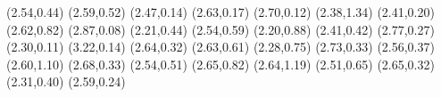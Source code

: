 \psdot[](2.54,0.44)
\psdot[](2.59,0.52)
\psdot[](2.47,0.14)
\psdot[](2.63,0.17)
\psdot[](2.70,0.12)
\psdot[](2.38,1.34)
\psdot[](2.41,0.20)
\psdot[](2.62,0.82)
\psdot[](2.87,0.08)
\psdot[](2.21,0.44)
\psdot[](2.54,0.59)
\psdot[](2.20,0.88)
\psdot[](2.41,0.42)
\psdot[](2.77,0.27)
\psdot[](2.30,0.11)
\psdot[](3.22,0.14)
\psdot[](2.64,0.32)
\psdot[](2.63,0.61)
\psdot[](2.28,0.75)
\psdot[](2.73,0.33)
\psdot[](2.56,0.37)
\psdot[](2.60,1.10)
\psdot[](2.68,0.33)
\psdot[](2.54,0.51)
\psdot[](2.65,0.82)
\psdot[](2.64,1.19)
\psdot[](2.51,0.65)
\psdot[](2.65,0.32)
\psdot[](2.31,0.40)
\psdot[](2.59,0.24)
